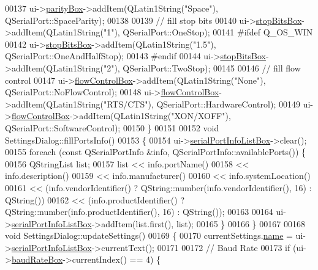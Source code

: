 \begin{DoxyCode}
{{{{{00137     ui->\hyperlink{a00029_a88c0b5d1f96a308ab115937b090f7bba}{parityBox}->addItem(QLatin1String(\textcolor{stringliteral}{"Space"}), QSerialPort::SpaceParity);
00138 
00139     \textcolor{comment}{// fill stop bits}
00140     ui->\hyperlink{a00029_ad61890c5fd0acc9e72385efd02df90c0}{stopBitsBox}->addItem(QLatin1String(\textcolor{stringliteral}{"1"}), QSerialPort::OneStop);
00141 \textcolor{preprocessor}{#ifdef Q\_OS\_WIN}
00142     ui->\hyperlink{a00029_ad61890c5fd0acc9e72385efd02df90c0}{stopBitsBox}->addItem(QLatin1String(\textcolor{stringliteral}{"1.5"}), QSerialPort::OneAndHalfStop);
00143 \textcolor{preprocessor}{#endif}
00144     ui->\hyperlink{a00029_ad61890c5fd0acc9e72385efd02df90c0}{stopBitsBox}->addItem(QLatin1String(\textcolor{stringliteral}{"2"}), QSerialPort::TwoStop);
00145 
00146     \textcolor{comment}{// fill flow control}
00147     ui->\hyperlink{a00029_a1ebdf5da704108eae1078cefc446fbef}{flowControlBox}->addItem(QLatin1String(\textcolor{stringliteral}{"None"}), QSerialPort::NoFlowControl);
00148     ui->\hyperlink{a00029_a1ebdf5da704108eae1078cefc446fbef}{flowControlBox}->addItem(QLatin1String(\textcolor{stringliteral}{"RTS/CTS"}), QSerialPort::HardwareControl);
00149     ui->\hyperlink{a00029_a1ebdf5da704108eae1078cefc446fbef}{flowControlBox}->addItem(QLatin1String(\textcolor{stringliteral}{"XON/XOFF"}), QSerialPort::SoftwareControl);
00150 \}
00151 
00152 \textcolor{keywordtype}{void} SettingsDialog::fillPortsInfo()
00153 \{
00154     ui->\hyperlink{a00029_a323eca0d6d4b94d2d41c7737fe8b2282}{serialPortInfoListBox}->clear();
00155     \textcolor{keywordflow}{foreach} (\textcolor{keyword}{const} QSerialPortInfo &info, QSerialPortInfo::availablePorts()) \{
00156         QStringList list;
00157         list << info.portName()
00158              << info.description()
00159              << info.manufacturer()
00160              << info.systemLocation()
00161              << (info.vendorIdentifier() ? QString::number(info.vendorIdentifier(), 16) : QString())
00162              << (info.productIdentifier() ? QString::number(info.productIdentifier(), 16) : QString());
00163 
00164         ui->\hyperlink{a00029_a323eca0d6d4b94d2d41c7737fe8b2282}{serialPortInfoListBox}->addItem(list.first(), list);
00165     \}
00166 \}
00167 
00168 \textcolor{keywordtype}{void} SettingsDialog::updateSettings()
00169 \{
00170     currentSettings.\hyperlink{a00022_a973c8cfb942a512f34fc4227c0caa6dd}{name} = ui->\hyperlink{a00029_a323eca0d6d4b94d2d41c7737fe8b2282}{serialPortInfoListBox}->currentText();
00171 
00172     \textcolor{comment}{// Baud Rate}
00173     \textcolor{keywordflow}{if} (ui->\hyperlink{a00029_a766a61db4a8c72219543f7c096ae5601}{baudRateBox}->currentIndex() == 4) \{
}}}}}
\end{DoxyCode}
